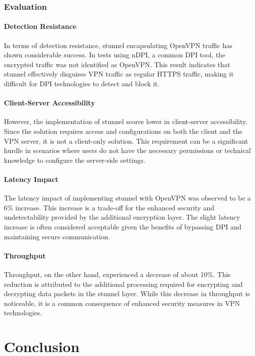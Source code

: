 \documentclass[12pt, fleqn, a4paper]{article}
\begin{document}
\subsubsection{Evaluation}
\paragraph{Detection Resistance}
In terms of detection resistance, stunnel encapsulating OpenVPN traffic has shown considerable success. In tests using nDPI, a common DPI tool, the encrypted traffic was not identified as OpenVPN. This result indicates that stunnel effectively disguises VPN traffic as regular HTTPS traffic, making it difficult for DPI technologies to detect and block it.

\paragraph{Client-Server Accessibility}
However, the implementation of stunnel scores lower in client-server accessibility. Since the solution requires access and configurations on both the client and the VPN server, it is not a client-only solution. This requirement can be a significant hurdle in scenarios where users do not have the necessary permissions or technical knowledge to configure the server-side settings.

\paragraph{Latency Impact}
The latency impact of implementing stunnel with OpenVPN was observed to be a 6\% increase. This increase is a trade-off for the enhanced security and undetectability provided by the additional encryption layer. The slight latency increase is often considered acceptable given the benefits of bypassing DPI and maintaining secure communication.

\paragraph{Throughput}
Throughput, on the other hand, experienced a decrease of about 10\%. This reduction is attributed to the additional processing required for encrypting and decrypting data packets in the stunnel layer. While this decrease in throughput is noticeable, it is a common consequence of enhanced security measures in VPN technologies.

\section*{\centering Conclusion}

%
\end{document}
